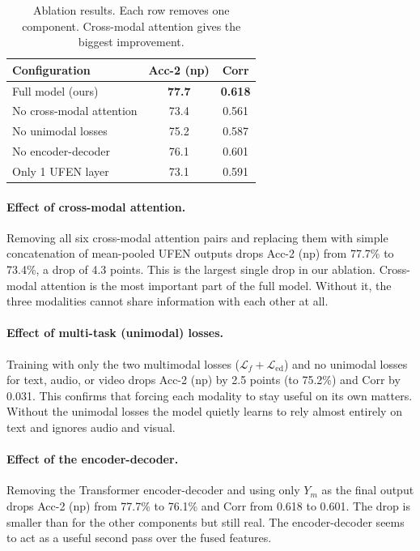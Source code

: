\documentclass[11pt,twocolumn]{article}
\begin{document}
\begin{table}[h]
\centering
\small
\begin{tabular}{lcc}
\toprule
\textbf{Configuration} & \textbf{Acc-2 (np)} & \textbf{Corr} \\
\midrule
Full model (ours)          & \textbf{77.7} & \textbf{0.618} \\
No cross-modal attention   & 73.4          & 0.561 \\
No unimodal losses         & 75.2          & 0.587 \\
No encoder-decoder         & 76.1          & 0.601 \\
Only 1 UFEN layer          & 73.1          & 0.591 \\
\bottomrule
\end{tabular}
\caption{Ablation results. Each row removes one component. Cross-modal attention gives the biggest improvement.}
\label{tab:ablation_summary}
\end{table}

\paragraph{Effect of cross-modal attention.} Removing all six cross-modal attention pairs and replacing them with simple concatenation of mean-pooled UFEN outputs drops Acc-2 (np) from 77.7\% to 73.4\%, a drop of 4.3 points. This is the largest single drop in our ablation. Cross-modal attention is the most important part of the full model. Without it, the three modalities cannot share information with each other at all.

\paragraph{Effect of multi-task (unimodal) losses.} Training with only the two multimodal losses ($\mathcal{L}_f + \mathcal{L}_{\text{ed}}$) and no unimodal losses for text, audio, or video drops Acc-2 (np) by 2.5 points (to 75.2\%) and Corr by 0.031. This confirms that forcing each modality to stay useful on its own matters. Without the unimodal losses the model quietly learns to rely almost entirely on text and ignores audio and visual.

\paragraph{Effect of the encoder-decoder.} Removing the Transformer encoder-decoder and using only $Y_m$ as the final output drops Acc-2 (np) from 77.7\% to 76.1\% and Corr from 0.618 to 0.601. The drop is smaller than for the other components but still real. The encoder-decoder seems to act as a useful second pass over the fused features.
\end{document}
